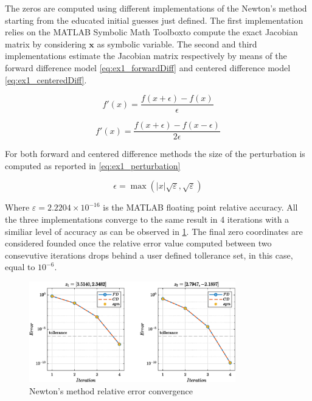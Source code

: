 \documentclass[11pt,a4paper,oneside]{article}
\renewcommand{\vec}[1]{\mathbf{#1}}
\begin{document}
The zeros are computed using different implementations of the Newton's method starting from the educated initial guesses just defined.
The first implementation relies on the MATLAB Symbolic Math Toolbox\texttrademark  to compute the exact Jacobian matrix by considering $\vec{x}$ as symbolic variable.
The second and third implementations estimate the Jacobian matrix respectively by means of the forward difference model \cref{eq:ex1_forwardDiff} and centered difference model \cref{eq:ex1_centeredDiff}.

\begin{equation}
    f'(x) = \frac{f(x + \epsilon) - f(x)}{\epsilon}
    \label{eq:ex1_forwardDiff}
\end{equation}

\begin{equation}
    f'(x) = \frac{f(x + \epsilon) - f(x - \epsilon)}{2 \epsilon}
    \label{eq:ex1_centeredDiff}
\end{equation}

For both forward and centered difference methods the size of the perturbation is computed as reported in \cref{eq:ex1_perturbation} 

\begin{equation}
    \epsilon = \max (\left\lvert x \right\rvert\sqrt{\varepsilon}, \sqrt{\varepsilon})
    \label{eq:ex1_perturbation}
\end{equation}

Where $\varepsilon=2.2204\times10^{-16}$ is the MATLAB floating point relative accuracy.
\clearpage
All the three implementations converge to the same result in 4 iterations with a similiar level of accuracy as can be observed in \cref{fig:ex1_convergence}.
The final zero coordinates are considered founded once the relative error value computed between two consevutive iterations drops behind a user defined tollerance set, in this case, equal to $10^{-6}$.

\begin{figure}[htb]
    \centering
    \includegraphics*[width=0.8\textwidth, keepaspectratio]{ex1_convergence.eps}
    \caption[]{\label{fig:ex1_convergence} Newton's method relative error convergence}
\end{figure}
\end{document}
